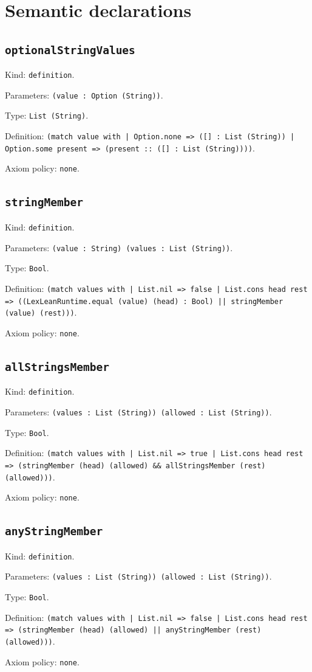 \documentclass[11pt]{article}
\begin{document}
\section*{Semantic declarations}
\subsection*{\texttt{optionalStringValues}}
\noindent Kind: \texttt{definition}.\par
\noindent Parameters: \texttt{(value : Option (String))}.\par
\noindent Type: \texttt{List (String)}.\par
\noindent Definition: \texttt{(match value with | Option.none => ([] : List (String)) | Option.some present => (present :: ([] : List (String))))}.\par
\noindent Axiom policy: \texttt{none}.\par
\subsection*{\texttt{stringMember}}
\noindent Kind: \texttt{definition}.\par
\noindent Parameters: \texttt{(value : String) (values : List (String))}.\par
\noindent Type: \texttt{Bool}.\par
\noindent Definition: \texttt{(match values with | List.nil => false | List.cons head rest => ((LexLeanRuntime.equal (value) (head) : Bool) || stringMember (value) (rest)))}.\par
\noindent Axiom policy: \texttt{none}.\par
\subsection*{\texttt{allStringsMember}}
\noindent Kind: \texttt{definition}.\par
\noindent Parameters: \texttt{(values : List (String)) (allowed : List (String))}.\par
\noindent Type: \texttt{Bool}.\par
\noindent Definition: \texttt{(match values with | List.nil => true | List.cons head rest => (stringMember (head) (allowed) \&\& allStringsMember (rest) (allowed)))}.\par
\noindent Axiom policy: \texttt{none}.\par
\subsection*{\texttt{anyStringMember}}
\noindent Kind: \texttt{definition}.\par
\noindent Parameters: \texttt{(values : List (String)) (allowed : List (String))}.\par
\noindent Type: \texttt{Bool}.\par
\noindent Definition: \texttt{(match values with | List.nil => false | List.cons head rest => (stringMember (head) (allowed) || anyStringMember (rest) (allowed)))}.\par
\noindent Axiom policy: \texttt{none}.\par
\end{document}
